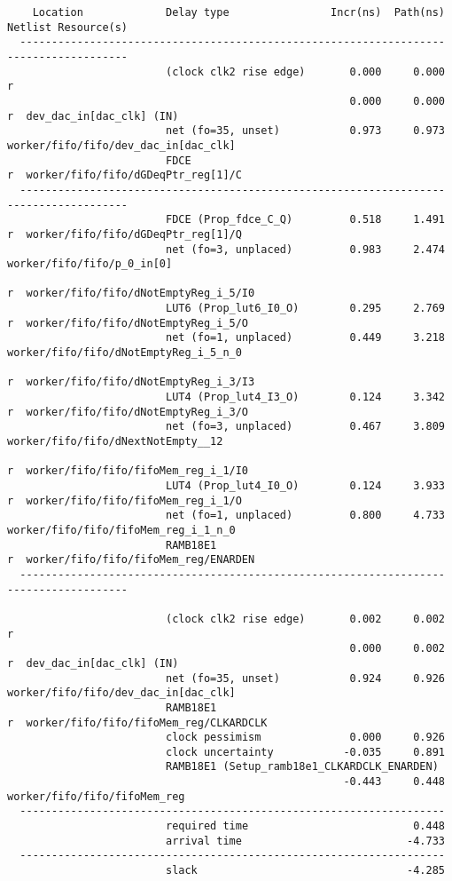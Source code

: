 \documentclass{article}
\begin{document}
\begin{lstlisting}
    Location             Delay type                Incr(ns)  Path(ns)    Netlist Resource(s)
  -------------------------------------------------------------------    -------------------
                         (clock clk2 rise edge)       0.000     0.000 r  
                                                      0.000     0.000 r  dev_dac_in[dac_clk] (IN)
                         net (fo=35, unset)           0.973     0.973    worker/fifo/fifo/dev_dac_in[dac_clk]
                         FDCE                                         r  worker/fifo/fifo/dGDeqPtr_reg[1]/C
  -------------------------------------------------------------------    -------------------
                         FDCE (Prop_fdce_C_Q)         0.518     1.491 r  worker/fifo/fifo/dGDeqPtr_reg[1]/Q
                         net (fo=3, unplaced)         0.983     2.474    worker/fifo/fifo/p_0_in[0]
                                                                      r  worker/fifo/fifo/dNotEmptyReg_i_5/I0
                         LUT6 (Prop_lut6_I0_O)        0.295     2.769 r  worker/fifo/fifo/dNotEmptyReg_i_5/O
                         net (fo=1, unplaced)         0.449     3.218    worker/fifo/fifo/dNotEmptyReg_i_5_n_0
                                                                      r  worker/fifo/fifo/dNotEmptyReg_i_3/I3
                         LUT4 (Prop_lut4_I3_O)        0.124     3.342 r  worker/fifo/fifo/dNotEmptyReg_i_3/O
                         net (fo=3, unplaced)         0.467     3.809    worker/fifo/fifo/dNextNotEmpty__12
                                                                      r  worker/fifo/fifo/fifoMem_reg_i_1/I0
                         LUT4 (Prop_lut4_I0_O)        0.124     3.933 r  worker/fifo/fifo/fifoMem_reg_i_1/O
                         net (fo=1, unplaced)         0.800     4.733    worker/fifo/fifo/fifoMem_reg_i_1_n_0
                         RAMB18E1                                     r  worker/fifo/fifo/fifoMem_reg/ENARDEN
  -------------------------------------------------------------------    -------------------

                         (clock clk2 rise edge)       0.002     0.002 r  
                                                      0.000     0.002 r  dev_dac_in[dac_clk] (IN)
                         net (fo=35, unset)           0.924     0.926    worker/fifo/fifo/dev_dac_in[dac_clk]
                         RAMB18E1                                     r  worker/fifo/fifo/fifoMem_reg/CLKARDCLK
                         clock pessimism              0.000     0.926    
                         clock uncertainty           -0.035     0.891    
                         RAMB18E1 (Setup_ramb18e1_CLKARDCLK_ENARDEN)
                                                     -0.443     0.448    worker/fifo/fifo/fifoMem_reg
  -------------------------------------------------------------------
                         required time                          0.448    
                         arrival time                          -4.733    
  -------------------------------------------------------------------
                         slack                                 -4.285    




\end{lstlisting}
\end{document}
